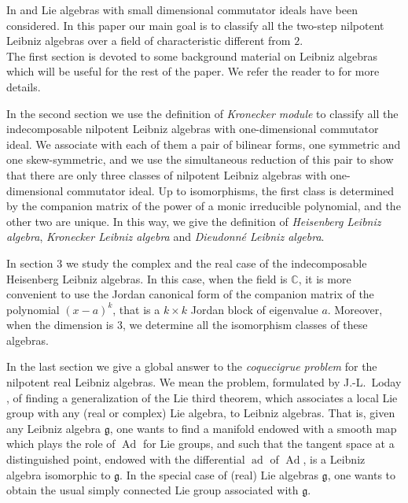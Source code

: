 \documentclass[english,4paper,10pt]{article}
\newcommand{\mg}{\mathfrak{g}}
\begin{document}
In \cite{falcone2016action} and \cite{bartolone2011nilpotent} Lie algebras with small dimensional commutator ideals have been considered. In this paper our main goal is to classify all the two-step nilpotent Leibniz algebras over a field of characteristic different from $2$.\\ 

The first section is devoted to some background material on Leibniz algebras which will be useful for the rest of the paper. We refer the reader to \cite{ayupov2019leibniz} for more details.

In the second section we use the definition of \emph{Kronecker module} to classify all the indecomposable nilpotent Leibniz algebras with one-dimensional commutator ideal. We associate with each of them a pair of bilinear forms, one symmetric and one skew-symmetric, and we use the simultaneous reduction of this pair to show that there are only three classes of nilpotent Leibniz algebras with one-dimensional commutator ideal. Up to isomorphisms, the first class is determined by the companion matrix of the power of a monic irreducible polynomial, and the other two are unique. In this way, we give the definition of \emph{Heisenberg Leibniz algebra}, \emph{Kronecker Leibniz algebra} and \emph{Dieudonné Leibniz algebra}.

In section 3 we study the complex and the real case of the indecomposable Heisenberg Leibniz algebras. In this case, when the field is $\mathbb{C}$, it is more convenient to use the Jordan canonical form of the companion matrix of the polynomial $(x-a)^k$, that is a $k \times k$ Jordan block of eigenvalue $a$. Moreover, when the dimension is $3$, we determine all the isomorphism classes of these algebras.

In the last section we give a global answer to the \textit{coquecigrue problem} for the nilpotent real Leibniz algebras. We mean the problem, formulated by J.-L.\ Loday \cite{loday1993version}, of finding a generalization of the Lie third theorem, which associates a local Lie group with any (real or complex) Lie algebra, to Leibniz algebras. That is, given any Leibniz algebra $\mg$, one wants to find a manifold endowed with a smooth map which plays the role of $\operatorname{Ad}$ for Lie groups, and such that the tangent space at a distinguished point, endowed with the differential $\operatorname{ad}$ of $\operatorname{Ad}$, is a Leibniz algebra isomorphic to $\mg$. In the special case of (real) Lie algebras $\mg$, one wants to obtain the usual simply connected Lie group associated with $\mg$.
\end{document}
